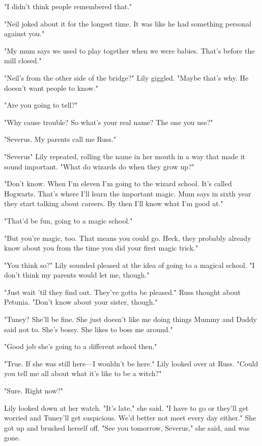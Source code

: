 "I didn't{\el} think people{\el} remembered that."

"Neil joked about it for the longest time. It was like he had something personal against you."

"My mum says we used to{\el} play together when we were{\el} babies. That's before the mill{\el} closed."

"Neil's from the other side of the bridge?" Lily giggled. "Maybe that's why. He doesn't want people to know."

"Are you going to{\el} tell?"

"Why cause trouble? So what's your real name? The one you use?"

"Severus. My parents{\el} call me Russ."

"Severus{\el}" Lily repeated, rolling the name in her mouth in a way that made it sound important. "What do wizards do when they grow up?"

"Don't know. When I'm{\el} eleven I'm going to the wizard{\el} school. It's called{\el} Hogwarts. That's where I'll learn the important{\el} magic. Mum says in sixth year they{\el} start talking about careers. By then I'll{\el} know what I'm good at."

"That'd be fun, going to a magic school."

"But you're{\el} magic, too. That means you could{\el} go. Heck, they probably already{\el} know about you from the time you{\el} did your first magic trick."

"You think so?" Lily sounded pleased at the idea of going to a magical school. "I don't think my parents would let me, though."

"Just wait 'til they{\el} find out. They've gotta be{\el} pleased." Russ thought about Petunia. "Don't know about your{\el} sister, though."

"Tuney? She'll be fine. She just doesn't like me doing things Mummy and Daddy said not to. She's bossy. She likes to boss me around."

"Good job she's going to a{\el} different school then."

"True. If she was still here—I wouldn't be here." Lily looked over at Russ. "Could you tell me all about what it's like to be a witch?"

"Sure. Right now?"

Lily looked down at her watch. "It's late," she said. "I have to go or they'll get worried and Tuney'll get suspicious. We'd better not meet every day either." She got up and brushed herself off. "See you tomorrow, Severus," she said, and was gone.

